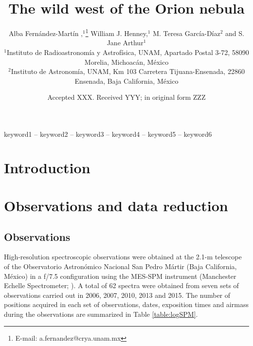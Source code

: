 \documentclass[a4paper,fleqn,usenatbib]{mnras}     %
\title[The wild west of the Orion nebula]{The wild west of the Orion nebula}
\author[Fern\'andez-Mart\'in et al.]{                                            %
Alba Fern\'andez-Mart\'in ,$^{1}$\thanks{E-mail: a.fernandez@crya.unam.mx}            %
William J. Henney,$^{1}$
M. Teresa Garc\'ia-D\'iaz$^{2}$
\newauthor                                                       %
and S. Jane Arthur$^{1}$
\\                                      %
$^{1}$Instituto de Radioastronom\'ia y Astrof\'isica, UNAM, Apartado Postal 3-72, 58090 Morelia, Michoac\'an, M\'exico\\
$^{2}$Instituto de Astronom\'ia, UNAM, Km 103 Carretera Tijuana-Ensenada, 22860 Ensenada, Baja California, M\'exico\\
}
\date{Accepted XXX. Received YYY; in original form ZZZ}
\begin{document}
\label{firstpage}
\pagerange{\pageref{firstpage}--\pageref{lastpage}}
\maketitle




\begin{abstract}
\end{abstract}

\begin{keywords}
keyword1 -- keyword2 -- keyword3 -- keyword4 -- keyword5 -- keyword6
\end{keywords}





\section{Introduction}\label{sec:introduction}










\section{Observations and data reduction}\label{sec:obs_and_red}



\subsection{Observations}\label{sec:observations}
High-resolution spectroscopic observations were obtained at the 2.1-m telescope of the Observatorio Astron\'omico 
Nacional San Pedro M\'artir (Baja California, M\'exico) in a f/7.5 configuration using the MES-SPM instrument (Manchester Echelle 
Spectrometer; \citealt{Meaburn2003}). A total of 62 spectra were obtained from seven sets of observations carried 
out in 2006, 2007, 2010, 2013 and 2015. The number of positions acquired in each set of observations, dates, exposition 
times and airmass during the observations are summarized in Table \ref{table:logSPM}.
\end{document}
